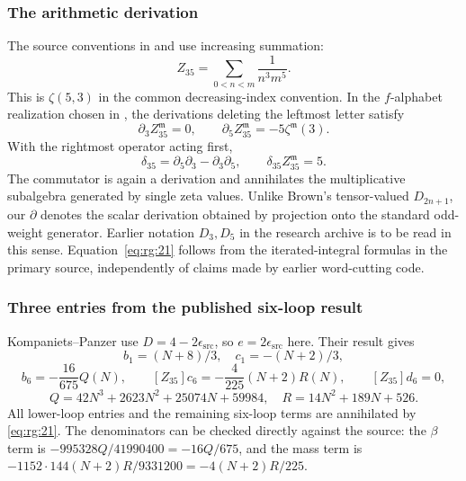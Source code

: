\documentclass[11pt,a4paper,oneside]{article}
\theoremstyle{plain}
\theoremstyle{definition}
\theoremstyle{remark}
\numberwithin{equation}{section}
\begin{document}
\subsubsection{The arithmetic derivation}\label{sec:rg:7.1}
The source conventions in \cite[equation (17)]{kp} and \cite[equation (2.6)]{brownmzv} use increasing summation:
\begin{equation}
Z_{35}=\sum_{0<n<m}\frac1{n^3m^5}.
\end{equation}
This is $\zeta(5,3)$ in the common decreasing-index convention. In the $f$-alphabet realization chosen in \cite[Section 6.1]{brownmzv}, the derivations deleting the leftmost letter satisfy
\begin{equation}
\partial_3 Z_{35}^{\mathfrak m}=0,\qquad
 \partial_5 Z_{35}^{\mathfrak m}=-5\zeta^{\mathfrak m}(3).
\end{equation}
With the rightmost operator acting first,
\begin{equation}
\delta_{35}=\partial_5\partial_3-\partial_3\partial_5,
 \qquad \delta_{35} Z_{35}^{\mathfrak m}=5.         \label{eq:rg:21}
\end{equation}
The commutator is again a derivation and annihilates the multiplicative subalgebra generated by single zeta values. Unlike Brown's tensor-valued $D_{2n+1}$, our $\partial$ denotes the scalar derivation obtained by projection onto the standard odd-weight generator. Earlier notation $D_3,D_5$ in the research archive is to be read in this sense. Equation~\eqref{eq:rg:21} follows from the iterated-integral formulas in the primary source, independently of claims made by earlier word-cutting code.

\subsubsection{Three entries from the published six-loop result}\label{sec:rg:7.2}
Kompaniets--Panzer\cite[equations (16), (18), (19)]{kp} use $D=4-2\epsilon_{\mathrm{src}}$, so $e=2\epsilon_{\mathrm{src}}$ here. Their result gives
\begin{equation}
b_1=(N+8)/3,\quad c_1=-(N+2)/3,
\end{equation}
\begin{equation}
[Z_{35}]b_6=-\frac{16}{675}Q(N),\qquad
 [Z_{35}]c_6=-\frac4{225}(N+2)R(N),\qquad
 [Z_{35}]d_6=0,
\end{equation}
\begin{equation}
Q=42N^3+2623N^2+25074N+59984,\quad
 R=14N^2+189N+526.                                 \label{eq:rg:22}
\end{equation}
All lower-loop entries and the remaining six-loop terms are annihilated by \eqref{eq:rg:21}. The denominators can be checked directly against the source: the $\beta$ term is $-995328Q/41990400=-16Q/675$, and the mass term is $-1152\cdot144(N+2)R/9331200=-4(N+2)R/225$.
\end{document}
